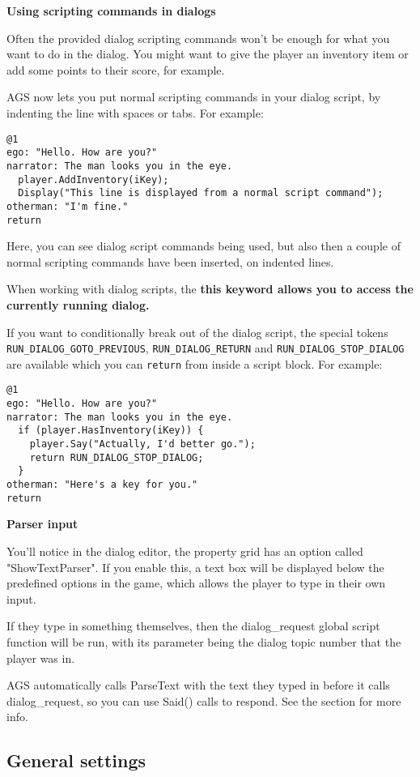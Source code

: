 \bf{Using scripting commands in dialogs}

Often the provided dialog scripting commands won't be enough for what you want
to do in the dialog. You might want to give the player an inventory item or
add some points to their score, for example.

AGS now lets you put normal scripting commands in your dialog script, by indenting
the line with spaces or tabs. For example:
\begin{verbatim}
@1
ego: "Hello. How are you?"
narrator: The man looks you in the eye.
  player.AddInventory(iKey);
  Display("This line is displayed from a normal script command");
otherman: "I'm fine."
return
\end{verbatim}
Here, you can see dialog script commands being used, but also then a
couple of normal scripting commands have been inserted, on indented lines.

When working with dialog scripts, the \bf{this} keyword allows you to access
the currently running dialog.

If you want to conditionally break out of the dialog
script, the special tokens \verb$RUN_DIALOG_GOTO_PREVIOUS$, \verb$RUN_DIALOG_RETURN$
and \verb$RUN_DIALOG_STOP_DIALOG$ are available which you can \verb$return$ from inside
a script block. For example:

\begin{verbatim}
@1
ego: "Hello. How are you?"
narrator: The man looks you in the eye.
  if (player.HasInventory(iKey)) {
    player.Say("Actually, I'd better go.");
    return RUN_DIALOG_STOP_DIALOG;
  }
otherman: "Here's a key for you."
return
\end{verbatim}

\bf{Parser input}

You'll notice in the dialog editor, the property grid has an option called "ShowTextParser".
If you enable this, a text box will be displayed below the predefined options in the game,
which allows the player to type in their own input.

If they type in something themselves, then the dialog_request global script function
will be run, with its parameter being the dialog topic number that the player was in.

AGS automatically calls ParseText with the text they typed in before it calls dialog_request,
so you can use Said() calls to respond. See the  section
for more info.

\subsection{General settings}%

